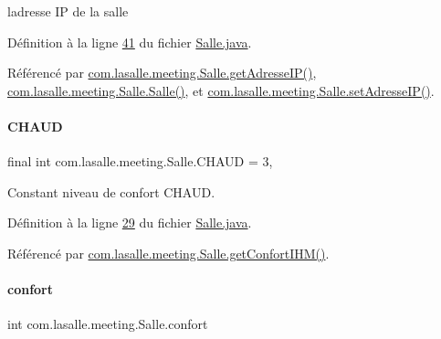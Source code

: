 l\textquotesingle{}adresse IP de la salle 



Définition à la ligne \hyperlink{_salle_8java_source_l00041}{41} du fichier \hyperlink{_salle_8java_source}{Salle.\+java}.



Référencé par \hyperlink{_salle_8java_source_l00285}{com.\+lasalle.\+meeting.\+Salle.\+get\+Adresse\+I\+P()}, \hyperlink{_salle_8java_source_l00054}{com.\+lasalle.\+meeting.\+Salle.\+Salle()}, et \hyperlink{_salle_8java_source_l00147}{com.\+lasalle.\+meeting.\+Salle.\+set\+Adresse\+I\+P()}.

\mbox{\label{classcom_1_1lasalle_1_1meeting_1_1_salle_af9e1ab39b745ab56a29910452fcc9814}} 
\paragraph{\texorpdfstring{C\+H\+A\+UD}{CHAUD}}
{\footnotesize\ttfamily final int com.\+lasalle.\+meeting.\+Salle.\+C\+H\+A\+UD = 3\hspace{0.3cm}{\ttfamily [static]}, {\ttfamily [private]}}



Constant niveau de confort C\+H\+A\+UD. 



Définition à la ligne \hyperlink{_salle_8java_source_l00029}{29} du fichier \hyperlink{_salle_8java_source}{Salle.\+java}.



Référencé par \hyperlink{_salle_8java_source_l00233}{com.\+lasalle.\+meeting.\+Salle.\+get\+Confort\+I\+H\+M()}.

\mbox{\label{classcom_1_1lasalle_1_1meeting_1_1_salle_ac165425fc78429c38042a0fed650b9ee}} 
\paragraph{\texorpdfstring{confort}{confort}}
{\footnotesize\ttfamily int com.\+lasalle.\+meeting.\+Salle.\+confort\hspace{0.3cm}{\ttfamily [private]}}



